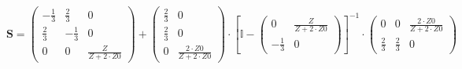 \[ \mathbf{S} = \left(\begin{array}{ccc} -\frac{1}{3} & \frac{2}{3} &
0 \\ \frac{2}{3} & -\frac{1}{3} & 0 \\ 0 & 0 & \frac{Z}{Z+2\cdot Z0}
\end{array}\right) + \left(\begin{array}{cc} \frac{2}{3} & 0 \\
\frac{2}{3} & 0 \\ 0 & \frac{2\cdot Z0}{Z+2\cdot Z0}
\end{array}\right) \cdot \left[ \mathbb{I}  - \left(\begin{array}{cc}
0 & \frac{Z}{Z+2\cdot Z0} \\ -\frac{1}{3} & 0 \end{array}\right)
\right]^{-1} \cdot\left(\begin{array}{ccc} 0 & 0 & \frac{2\cdot
Z0}{Z+2\cdot Z0} \\ \frac{2}{3} & \frac{2}{3} & 0 \end{array}\right)
\]
